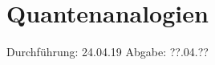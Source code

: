 

\subject{V23}
\title{Quantenanalogien}
\date{
  Durchführung: 24.04.19
  \hspace{3em}
  Abgabe: ??.04.??
}



\maketitle
\thispagestyle{empty}
\tableofcontents
\newpage




%



\newpage
\printbibliography


